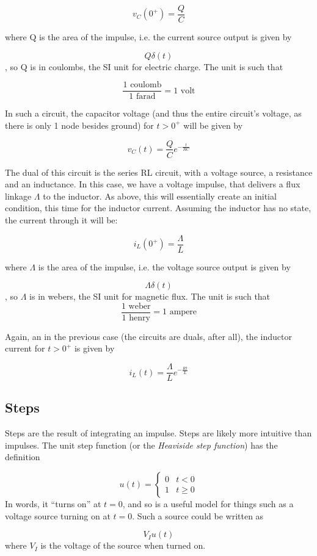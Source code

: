 \documentclass[12pt,a4paper]{report}
\begin{document}
\[ v_C(0^{+}) = \frac{Q}{C} \]

where Q is the area of the impulse, i.e. the current source output is given by

\[ Q \delta(t) \], so Q is in coulombs, the SI unit for electric charge. The unit is such that

\[ \frac{1\text{ coulomb}}{1\text{ farad}} = 1\text{ volt} \]

In such a circuit, the capacitor voltage (and thus the entire circuit's voltage, as there is only 1 node besides ground) for $t > 0^{+}$ will be given by

\[ v_C(t) = \frac{Q}{C} e^{-\frac{t}{RC}} \]

The dual of this circuit is the series RL circuit, with a voltage source, a resistance and an inductance. In this case, we have a voltage impulse, that delivers a flux linkage $\Lambda$ to the inductor. As above, this will essentially create an initial condition, this time for the inductor current. Assuming the inductor has no state, the current through it will be:

\[ i_L(0^{+}) = \frac{\Lambda}{L} \]

where $\Lambda$ is the area of the impulse, i.e. the voltage source output is given by

\[ \Lambda \delta(t) \], so $\Lambda$ is in webers, the SI unit for magnetic flux. The unit is such that
\[ \frac{1\text{ weber}}{1\text{ henry}} = 1\text{ ampere} \]

Again, an in the previous case (the circuits are duals, after all), the inductor current for $t > 0^{+}$ is given by

\[ i_L(t) = \frac{\Lambda}{L} e^{-\frac{R t}{L}} \] 

\subsection{Steps}
Steps are the result of integrating an impulse. Steps are likely more intuitive than impulses. The unit step function (or the \emph{Heaviside step function}) has the definition

\[ u(t) = 
  \begin{cases}
   0  & t < 0 \\
   1  & t \ge 0
  \end{cases}
\]
In words, it ``turns on'' at $t = 0$, and so is a useful model for things such as a voltage source turning on at $t = 0$. Such a source could be written as

\[ V_I u(t) \]
where $V_I$ is the voltage of the source when turned on.\\
\end{document}
